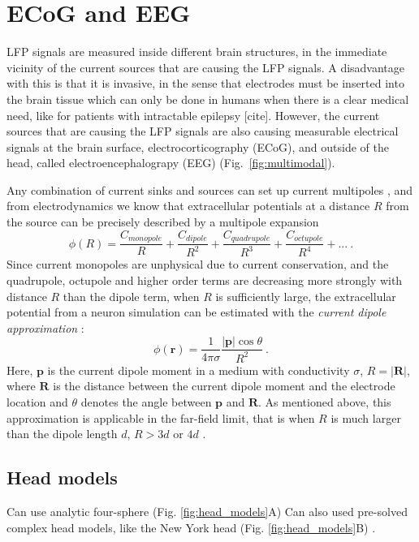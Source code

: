 \documentclass[preprint,11pt,authoryear]{elsarticle}
\begin{document}
\section{ECoG and EEG}
\label{sec:EEG}
LFP signals are measured inside different brain structures, in the immediate vicinity of the current sources that are causing the LFP signals. A disadvantage with this is that it is invasive, in the sense that electrodes must be inserted into the brain tissue which can only be done in humans when there is a clear medical need, like for patients with intractable epilepsy [cite]. However, the current sources that are causing the LFP signals are also causing measurable electrical signals at the brain surface, electrocorticography (ECoG), and outside of the head, called electroencephalograpy (EEG) (Fig.~\ref{fig:multimodal}).

Any combination of current sinks and sources can set up current multipoles \citep{Nunez2006}, and from electrodynamics we know that extracellular potentials at a distance $R$ from the source can be precisely described by a multipole expansion
\begin{equation}
\phi(R) = \frac{C_{monopole}}{R} + \frac{C_{dipole}}{R^2} + \frac{C_{quadrupole}}{R^3} + \frac{C_{octupole}}{R^4} + ...~.
\label{eq:dipole_expansion}
\end{equation}
Since current monopoles are unphysical due to current conservation, and the quadrupole, octupole and higher order terms are decreasing more strongly with distance $R$ than the dipole term, when $R$ is sufficiently large, the extracellular potential from a neuron simulation can be estimated with the \textit{current dipole approximation} \citep{Pettersen2008, Pettersen2014, Nunez2006}:
\begin{equation}
\phi(\mathbf{r}) = \frac{1}{4 \pi \sigma} \frac{|\mathbf{p}| \cos \theta}{R^2}~.
\label{eq:dipole}
\end{equation}
Here, $\mathbf{p}$ is the current dipole moment in a medium with conductivity $\sigma$, $R = |\mathbf{R}|$, where $\mathbf{R}$ is the distance between the current dipole moment and the electrode location and $\theta$ denotes the angle between $\mathbf{p}$ and $\mathbf{R}$. As mentioned above, this approximation is applicable in the far-field limit, that is when $R$ is much larger than the dipole length $d$, $R > 3d$ or $4d$ \citep{Nunez2006}.

\subsection{Head models}
Can use analytic four-sphere (Fig. \ref{fig:head_models}A) \citep{Hagen2018, Naess2017}
Can also used pre-solved complex head models, like the New York head (Fig. \ref{fig:head_models}B) \citep{Huang2016}.
\end{document}
